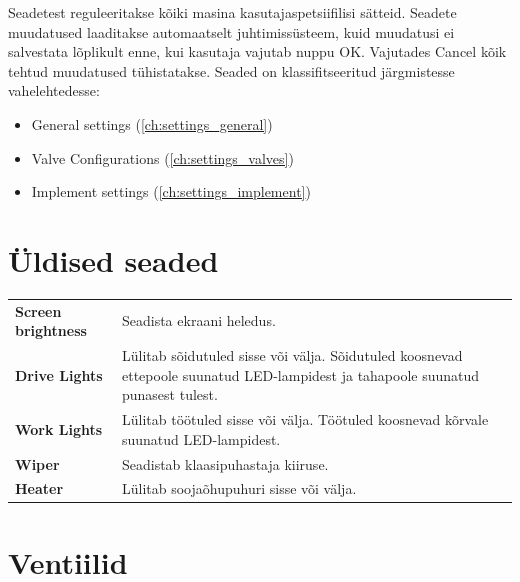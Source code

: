 \documentclass[12pt,a4paper,english]{uvmanual}
\begin{document}
Seadetest reguleeritakse kõiki masina kasutajaspetsiifilisi sätteid. Seadete muudatused laaditakse automaatselt juhtimissüsteem, kuid muudatusi ei salvestata lõplikult enne, kui kasutaja vajutab nuppu OK. Vajutades Cancel kõik tehtud muudatused tühistatakse. Seaded on klassifitseeritud järgmistesse vahelehtedesse:

\begin{itemize}
 \item General settings (\autoref{ch:settings_general})
 \item Valve Configurations (\autoref{ch:settings_valves})
 \item Implement settings (\autoref{ch:settings_implement})
\end{itemize}


\section{Üldised seaded}\label{ch:settings_general}



\begin{tabular}{ L{0.2\textwidth} L{0.66\textwidth} }
\textbf{Screen brightness} & Seadista ekraani heledus. \\
\textbf{Drive Lights} & Lülitab sõidutuled sisse või välja. Sõidutuled koosnevad ettepoole suunatud LED-lampidest ja tahapoole suunatud punasest tulest.  \\
\textbf{Work Lights} & Lülitab töötuled sisse või välja. Töötuled koosnevad kõrvale suunatud LED-lampidest.  \\
\textbf{Wiper} & Seadistab klaasipuhastaja kiiruse.  \\
\textbf{Heater} & Lülitab soojaõhupuhuri sisse või välja. \\
\end{tabular}




\section{Ventiilid}\label{ch:settings_valves}
\end{document}
